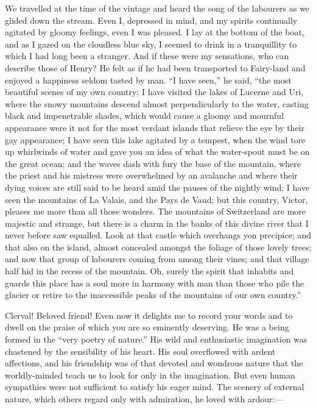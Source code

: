 \documentclass[12pt,openright]{book}
\begin{document}
We travelled at the time of the vintage and heard the song of the labourers as we glided down the stream. Even I, depressed in mind, and my spirits continually agitated by gloomy feelings, even I was pleased. I lay at the bottom of the boat, and as I gazed on the cloudless blue sky, I seemed to drink in a tranquillity to which I had long been a stranger. And if these were my sensations, who can describe those of Henry? He felt as if he had been transported to Fairy-land and enjoyed a happiness seldom tasted by man. “I have seen,” he said, “the most beautiful scenes of my own country; I have visited the lakes of Lucerne and Uri, where the snowy mountains descend almost perpendicularly to the water, casting black and impenetrable shades, which would cause a gloomy and mournful appearance were it not for the most verdant islands that relieve the eye by their gay appearance; I have seen this lake agitated by a tempest, when the wind tore up whirlwinds of water and gave you an idea of what the water-spout must be on the great ocean; and the waves dash with fury the base of the mountain, where the priest and his mistress were overwhelmed by an avalanche and where their dying voices are still said to be heard amid the pauses of the nightly wind; I have seen the mountains of La Valais, and the Pays de Vaud; but this country, Victor, pleases me more than all those wonders. The mountains of Switzerland are more majestic and strange, but there is a charm in the banks of this divine river that I never before saw equalled. Look at that castle which overhangs yon precipice; and that also on the island, almost concealed amongst the foliage of those lovely trees; and now that group of labourers coming from among their vines; and that village half hid in the recess of the mountain. Oh, surely the spirit that inhabits and guards this place has a soul more in harmony with man than those who pile the glacier or retire to the inaccessible peaks of the mountains of our own country.”

Clerval! Beloved friend! Even now it delights me to record your words and to dwell on the praise of which you are so eminently deserving. He was a being formed in the “very poetry of nature.” His wild and enthusiastic imagination was chastened by the sensibility of his heart. His soul overflowed with ardent affections, and his friendship was of that devoted and wondrous nature that the worldly-minded teach us to look for only in the imagination. But even human sympathies were not sufficient to satisfy his eager mind. The scenery of external nature, which others regard only with admiration, he loved with ardour:—
\end{document}
